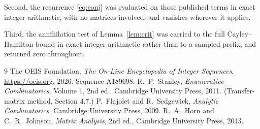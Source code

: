 \documentclass[11pt,a4paper]{article}
\theoremstyle{plain}
\theoremstyle{definition}
\begin{document}
Second, the recurrence \eqref{eq:conj} was evaluated on those published terms in exact
integer arithmetic, with no matrices involved, and vanishes wherever it applies.

Third, the annihilation test of Lemma~\ref{lem:crit} was carried to the full
Cayley--Hamilton bound in exact integer arithmetic rather than to a sampled prefix, and
returned zero throughout.

\begin{thebibliography}{9}
 The OEIS Foundation, \emph{The On-Line Encyclopedia of Integer
Sequences}, \url{https://oeis.org}, 2026. Sequence A189698.
 R.~P.~Stanley, \emph{Enumerative Combinatorics}, Volume 1, 2nd ed.,
Cambridge University Press, 2011. (Transfer-matrix method, Section 4.7.)
 P.~Flajolet and R.~Sedgewick, \emph{Analytic Combinatorics}, Cambridge
University Press, 2009.
 R.~A.~Horn and C.~R.~Johnson, \emph{Matrix Analysis}, 2nd ed., Cambridge
University Press, 2013.
\end{thebibliography}
\end{document}
